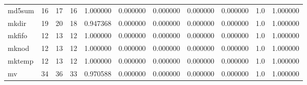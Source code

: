\begin{longtable}{lrrrrrrrrrr}
md5sum    &                                      16 &                 17 &                                16 &                                   1.000000 &                               0.000000 &                                     0.000000 &                          0.000000 &                                0.000000 &                                1.0 &                                           1.000000 \\
mkdir     &                                      19 &                 20 &                                18 &                                   0.947368 &                               0.000000 &                                     0.000000 &                          0.000000 &                                0.000000 &                                1.0 &                                           1.000000 \\
mkfifo    &                                      12 &                 13 &                                12 &                                   1.000000 &                               0.000000 &                                     0.000000 &                          0.000000 &                                0.000000 &                                1.0 &                                           1.000000 \\
mknod     &                                      12 &                 13 &                                12 &                                   1.000000 &                               0.000000 &                                     0.000000 &                          0.000000 &                                0.000000 &                                1.0 &                                           1.000000 \\
mktemp    &                                      12 &                 13 &                                12 &                                   1.000000 &                               0.000000 &                                     0.000000 &                          0.000000 &                                0.000000 &                                1.0 &                                           1.000000 \\
mv        &                                      34 &                 36 &                                33 &                                   0.970588 &                               0.000000 &                                     0.000000 &                          0.000000 &                                0.000000 &                                1.0 &                                           1.000000 \\

\end{longtable}
